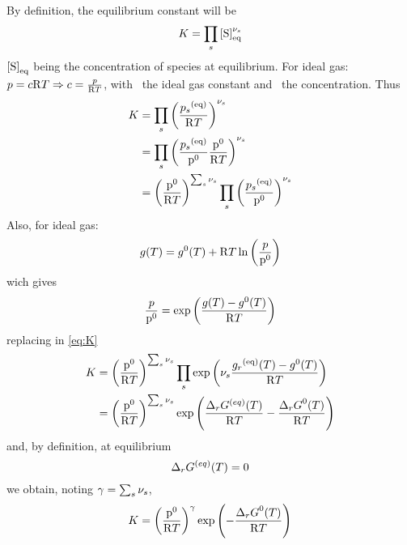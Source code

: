 By definition, the equilibrium constant will be
\begin{equation}
\Eqconst = \prod_s \conc[S]_{\eq}^{\scoef[s]}
\label{eq:Kdef}
\end{equation}
$\conc[S]_{\eq}$ being the concentration of species  at equilibrium.
For ideal gas:
$\press = \conc\Rg \Temp \Rightarrow \conc = \frac{\press}{\Rg \Temp}$, 
with \Rg\ the ideal gas constant and \conc\ the concentration. Thus
\begin{equation}
\begin{split}
\Eqconst 
  & = \prod_s \left(\frac{\press[s]^{(\eq)}}{\Rg \Temp}\right)^{\scoef[s]} \\
  & = \prod_s \left(\frac{\press[s]^{(\eq)}}{\pz}\frac{\pz}{\Rg \Temp}\right)^{\scoef[s]} \\
  & = \left(\frac{\pz}{\Rg \Temp}\right)^{\sum_s\scoef[s]} \prod_s \left(\frac{\press[s]^{(\eq)}}{\pz}\right)^{\scoef[s]}
\label{eq:K}
\end{split}
\end{equation}
Also, for ideal gas:
\begin{equation}
\gibbs(\Temp) = \gibbsZ(\Temp) + \Rg \Temp \ln\left(\frac{\press}{\pz}\right)
\end{equation}
wich gives
\begin{equation}
\frac{\press}{\pz} = \exp\left(\frac{\gibbs(\Temp) - \gibbsZ(\Temp)}{\Rg \Temp}\right)
\end{equation}
replacing in \ref{eq:K}
\begin{equation}
\begin{split}
\Eqconst
  & = \left(\frac{\pz}{\Rg \Temp}\right)^{\sum_s\scoef[s]}
           \prod_s \exp\left(\scoef[s] \frac{\gibbs[r]^{(\eq)}(\Temp) - \gibbsZ(\Temp)}{\Rg \Temp}\right) \\
  & = \left(\frac{\pz}{\Rg \Temp}\right)^{\sum_s\scoef[s]} 
           \exp\left(\frac{\DGibbs[r]^{(eq)}(\Temp)}{\Rg \Temp} - \frac{\DGibbsZ[r](\Temp)}{\Rg \Temp}\right) \\
\end{split}
\end{equation}
and, by definition, at equilibrium
\begin{equation}
\DGibbs[r]^{(eq)}(\Temp) = 0
\end{equation}
we obtain, noting $\gamma = \sum_s \scoef[s]$,
\begin{equation}
\Eqconst = \left(\frac{\pz}{\Rg \Temp}\right)^\gamma \exp\left(-\frac{\DGibbsZ[r](\Temp)}{\Rg \Temp}\right)
\end{equation}

